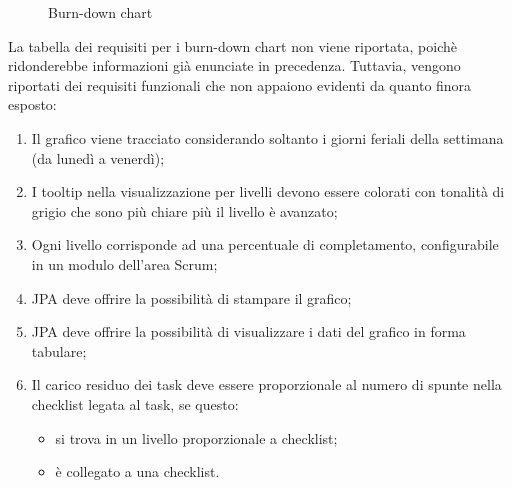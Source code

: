 \begin{figure}[H]
  \vspace*{\fill}
  \caption{Burn-down chart}
  \label{fig:bdchart}
\end{figure}

La tabella dei requisiti per i burn-down chart non viene riportata, poichè
ridonderebbe informazioni già enunciate in precedenza. Tuttavia, vengono
riportati dei requisiti funzionali che non appaiono evidenti da quanto finora
esposto:

\begin{enumerate}
\item Il grafico viene tracciato considerando soltanto i giorni feriali della
  settimana (da lunedì a venerdì);
\item I tooltip nella visualizzazione per livelli devono essere colorati con
  tonalità di grigio che sono più chiare più il livello è avanzato;
\item Ogni livello corrisponde ad una percentuale di completamento,
  configurabile in un modulo dell'area Scrum;
\item JPA deve offrire la possibilità di stampare il grafico;
\item JPA deve offrire la possibilità di visualizzare i dati del grafico in
  forma tabulare;
\item Il carico residuo dei task deve essere proporzionale al numero di spunte
  nella checklist legata al task, se questo:
  \begin{itemize}
  \item si trova in un livello proporzionale a checklist;
  \item è collegato a una checklist.
  \end{itemize}
\end{enumerate}

